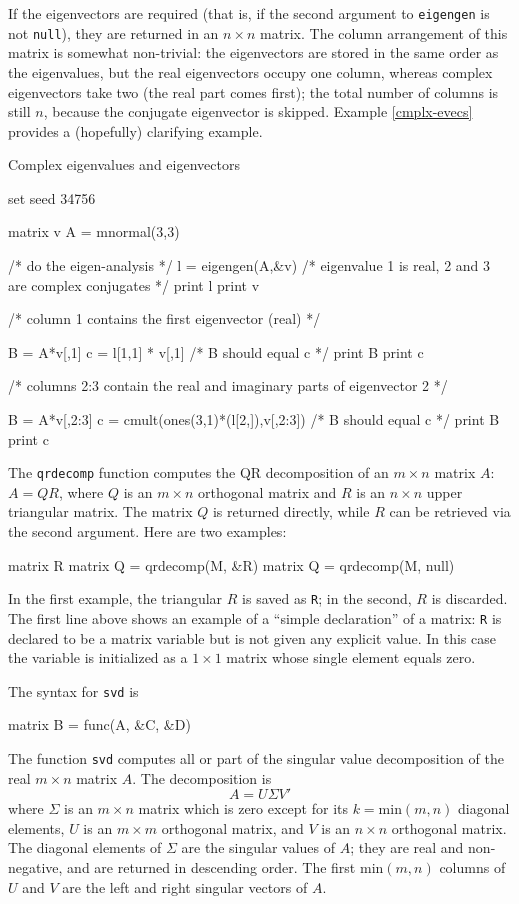 If the eigenvectors are required (that is, if the second argument to
\texttt{eigengen} is not \texttt{null}), they are returned in an $n
\times n$ matrix. The column arrangement of this matrix is somewhat
non-trivial: the eigenvectors are stored in the same order as the
eigenvalues, but the real eigenvectors occupy one column, whereas
complex eigenvectors take two (the real part comes first); the total
number of columns is still $n$, because the conjugate eigenvector is
skipped. Example \ref{cmplx-evecs} provides a (hopefully) clarifying
example.

\begin{script}[htbp]
  \caption{Complex eigenvalues and eigenvectors}
  \label{cmplx-evecs}
\begin{scode}
set seed 34756

matrix v
A = mnormal(3,3)

/* do the eigen-analysis */
l = eigengen(A,&v)
/* eigenvalue 1 is real, 2 and 3 are complex conjugates */
print l
print v

/* 
  column 1 contains the first eigenvector (real)
*/

B = A*v[,1]
c = l[1,1] * v[,1]
/* B should equal c */
print B
print c


/* 
  columns 2:3 contain the real and imaginary parts
  of eigenvector 2
*/

B = A*v[,2:3]
c = cmult(ones(3,1)*(l[2,]),v[,2:3])
/* B should equal c */
print B
print c
\end{scode}
\end{script}

The \texttt{qrdecomp} function computes the QR decomposition of an $m
\times n$ matrix $A$: $A = QR$, where $Q$ is an $m \times n$
orthogonal matrix and $R$ is an $n \times n$ upper triangular matrix.
The matrix $Q$ is returned directly, while $R$ can be retrieved via
the second argument.  Here are two examples:
%
\begin{code}
matrix R
matrix Q = qrdecomp(M, &R)
matrix Q = qrdecomp(M, null)
\end{code}
%
In the first example, the triangular $R$ is saved as \texttt{R}; in
the second, $R$ is discarded.  The first line above shows an example
of a ``simple declaration'' of a matrix: \texttt{R} is
declared to be a matrix variable but is not given any explicit value.
In this case the variable is initialized as a $1\times 1$ matrix whose
single element equals zero.

The syntax for \texttt{svd} is
%
\begin{code}
matrix B = func(A, &C, &D)
\end{code}
%
The function \texttt{svd} computes all or part of the singular value
decomposition of the real $m \times n$ matrix $A$.  The decomposition
is
\[
A = U \Sigma V'
\]
where $\Sigma$ is an $m \times n$ matrix which is zero except for its
$k = \mbox{min}(m, n)$ diagonal elements, $U$ is an $m \times m$
orthogonal matrix, and $V$ is an $n \times n$ orthogonal matrix.  The
diagonal elements of $\Sigma$ are the singular values of $A$; they are
real and non-negative, and are returned in descending order.  The
first $\mbox{min}(m, n)$ columns of $U$ and $V$ are the left and right
singular vectors of $A$.

